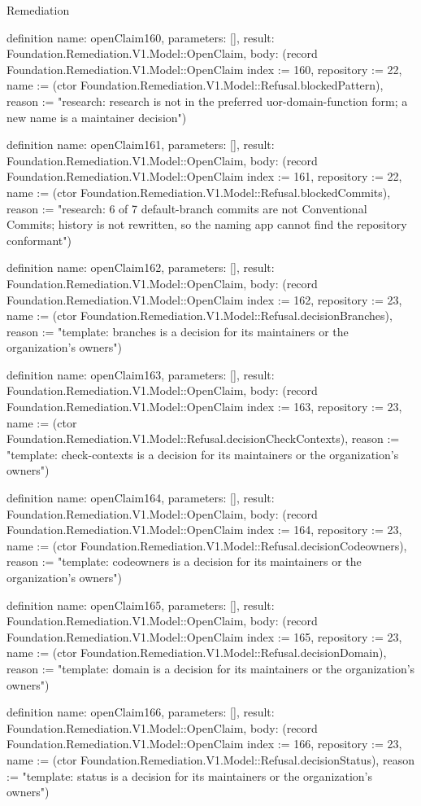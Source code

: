 \begin{lexlean}{Remediation}
\begin{semanticmodule}
definition{
  name: openClaim160,
  parameters: [],
  result: Foundation.Remediation.V1.Model::OpenClaim,
  body: (record Foundation.Remediation.V1.Model::OpenClaim {index := 160, repository := 22, name := (ctor Foundation.Remediation.V1.Model::Refusal.blockedPattern), reason := "research: research is not in the preferred uor-{domain}-{function} form; a new name is a maintainer decision"})
}

definition{
  name: openClaim161,
  parameters: [],
  result: Foundation.Remediation.V1.Model::OpenClaim,
  body: (record Foundation.Remediation.V1.Model::OpenClaim {index := 161, repository := 22, name := (ctor Foundation.Remediation.V1.Model::Refusal.blockedCommits), reason := "research: 6 of 7 default-branch commits are not Conventional Commits; history is not rewritten, so the naming app cannot find the repository conformant"})
}

definition{
  name: openClaim162,
  parameters: [],
  result: Foundation.Remediation.V1.Model::OpenClaim,
  body: (record Foundation.Remediation.V1.Model::OpenClaim {index := 162, repository := 23, name := (ctor Foundation.Remediation.V1.Model::Refusal.decisionBranches), reason := "template: branches is a decision for its maintainers or the organization's owners"})
}

definition{
  name: openClaim163,
  parameters: [],
  result: Foundation.Remediation.V1.Model::OpenClaim,
  body: (record Foundation.Remediation.V1.Model::OpenClaim {index := 163, repository := 23, name := (ctor Foundation.Remediation.V1.Model::Refusal.decisionCheckContexts), reason := "template: check-contexts is a decision for its maintainers or the organization's owners"})
}

definition{
  name: openClaim164,
  parameters: [],
  result: Foundation.Remediation.V1.Model::OpenClaim,
  body: (record Foundation.Remediation.V1.Model::OpenClaim {index := 164, repository := 23, name := (ctor Foundation.Remediation.V1.Model::Refusal.decisionCodeowners), reason := "template: codeowners is a decision for its maintainers or the organization's owners"})
}

definition{
  name: openClaim165,
  parameters: [],
  result: Foundation.Remediation.V1.Model::OpenClaim,
  body: (record Foundation.Remediation.V1.Model::OpenClaim {index := 165, repository := 23, name := (ctor Foundation.Remediation.V1.Model::Refusal.decisionDomain), reason := "template: domain is a decision for its maintainers or the organization's owners"})
}

definition{
  name: openClaim166,
  parameters: [],
  result: Foundation.Remediation.V1.Model::OpenClaim,
  body: (record Foundation.Remediation.V1.Model::OpenClaim {index := 166, repository := 23, name := (ctor Foundation.Remediation.V1.Model::Refusal.decisionStatus), reason := "template: status is a decision for its maintainers or the organization's owners"})
}


\end{semanticmodule}
\end{lexlean}
